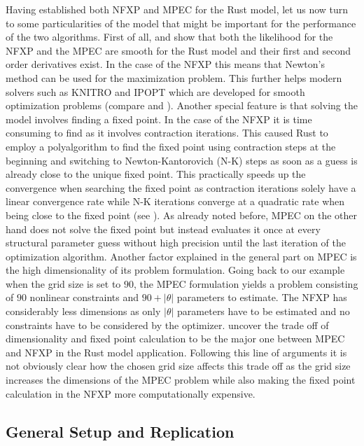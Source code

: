Having established both NFXP and MPEC for the Rust model, let us now turn to some particularities of the model that might be important for the performance of the two algorithms. First of all, \cite{Rust.1987} and \cite{Su.Judd.2012} show that both the likelihood for the NFXP and the MPEC are smooth for the Rust model and their first and second order derivatives exist. In the case of the NFXP this means that Newton's method can be used for the maximization problem. This further helps modern solvers such as KNITRO and IPOPT which are developed for smooth optimization problems (compare \cite{Byrd.Nocedal.Waltz.2006} and \cite{Waechter2009}). Another special feature is that solving the model involves finding a fixed point. In the case of the NFXP it is time consuming to find as it involves contraction iterations. This caused Rust to employ a polyalgorithm to find the fixed point using contraction steps at the beginning and switching to Newton-Kantorovich (N-K) steps as soon as a guess is already close to the unique fixed point. This practically speeds up the convergence when searching the fixed point as contraction iterations solely have a linear convergence rate while N-K iterations converge at a quadratic rate when being close to the fixed point (see \cite{Rust.1987, Rust.2000}). As already noted before, MPEC on the other hand does not solve the fixed point but instead evaluates it once at every structural parameter guess without high precision until the last iteration of the optimization algorithm. Another factor explained in the general part on MPEC is the high dimensionality of its problem formulation. Going back to our example when the grid size is set to $90$, the MPEC formulation yields a problem consisting of $90$ nonlinear constraints and $90 + |\theta|$ parameters to estimate. The NFXP has considerably less dimensions as only $|\theta|$ parameters have to be estimated and no constraints have to be considered by the optimizer. \cite{Su.Judd.2012} uncover the trade off of dimensionality and fixed point calculation to be the major one between MPEC and NFXP in the Rust model application. Following this line of arguments it is not obviously clear how the chosen grid size affects this trade off as the grid size increases the dimensions of the MPEC problem while also making the fixed point calculation in the NFXP more computationally expensive.

\subsection{General Setup and Replication} \label{generalsetup}

